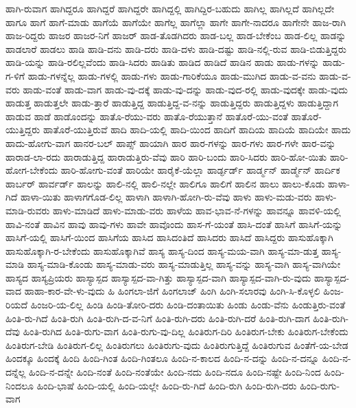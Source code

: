 {ಹಾಗಿ-ರುವಾಗ
ಹಾಗಿದ್ದರೂ
ಹಾಗಿದ್ದರೆ
ಹಾಗಿದ್ದರೇ
ಹಾಗಿದ್ದಲ್ಲಿ
ಹಾಗಿದ್ದಿರ-ಬಹುದು
ಹಾಗಿಲ್ಲ
ಹಾಗಿಲ್ಲದೆ
ಹಾಗಿಲ್ಲದೇ
ಹಾಗೂ
ಹಾಗೆ
ಹಾಗೆ-ಮಾಡು
ಹಾಗೆಯೆ
ಹಾಗೆಯೇ
ಹಾಗೆಲ್ಲ
ಹಾಗೆಲ್ಲಾ
ಹಾಗೇ
ಹಾಗೇ-ನಾದರೂ
ಹಾಗೇನೇ
ಹಾಜ-ರಾಗಿ
ಹಾಜ-ರಿದ್ದರು
ಹಾಜರ
ಹಾಜರ-ನಿಗೆ
ಹಾಜರ್
ಹಾಡ-ತೊಡಗಿದರು
ಹಾಡ-ಬಲ್ಲ
ಹಾಡ-ಬೇಕೆಂಬ
ಹಾಡ-ಲಿಲ್ಲ
ಹಾಡನ್ನು
ಹಾಡಲಾರೆ
ಹಾಡಲು
ಹಾಡಿ
ಹಾಡಿ-ದನು
ಹಾಡಿ-ದರು
ಹಾಡಿ-ದಳು
ಹಾಡಿ-ದಷ್ಟು
ಹಾಡಿ-ನಲ್ಲಿ-ರುವ
ಹಾಡಿ-ಬಿಡುತ್ತಿದ್ದರು
ಹಾಡಿ-ಯನ್ನು
ಹಾಡಿ-ರಲಿಲ್ಲವೆಂದು
ಹಾಡಿ-ಸಿದರು
ಹಾಡಿತು
ಹಾಡಿದ
ಹಾಡಿದೆ
ಹಾಡಿನ
ಹಾಡು
ಹಾಡು-ಗಳನ್ನು
ಹಾಡು-ಗ-ಳಿಗೆ
ಹಾಡು-ಗಳನ್ನೆಲ್ಲ
ಹಾಡು-ಗಳಲ್ಲಿ
ಹಾಡು-ಗಳು
ಹಾಡು-ಗಾರಿಕೆಯೂ
ಹಾಡು-ಮುಗಿದ
ಹಾಡು-ವ-ವನು
ಹಾಡು-ವ-ವರು
ಹಾಡು-ವಂತೆ
ಹಾಡು-ವಾಗ
ಹಾಡು-ವು-ದಕ್ಕೆ
ಹಾಡು-ವು-ದನ್ನು
ಹಾಡು-ವುದ-ರಲ್ಲಿ
ಹಾಡು-ವುದಕ್ಕೇ
ಹಾಡು-ವುದು
ಹಾಡುತ್ತ
ಹಾಡುತ್ತಲೇ
ಹಾಡು-ತ್ತಾರೆ
ಹಾಡುತ್ತಿದ್ದ
ಹಾಡುತ್ತಿದ್ದ-ವ-ನನ್ನು
ಹಾಡುತ್ತಿದ್ದರು
ಹಾಡುತ್ತಿದ್ದಳು
ಹಾಡುತ್ತಿದ್ದಾಗ
ಹಾಡುವ
ಹಾಡೆ
ಹಾಡೊಂದನ್ನು
ಹಾತೊ-ರೆಯು-ವರು
ಹಾತೊ-ರೆಯುತ್ತಾನೆ
ಹಾತೊರೆ-ಯು-ವಂತೆ
ಹಾತೊರೆ-ಯುತ್ತಿದ್ದರು
ಹಾತೊರೆ-ಯುತ್ತಿರುವೆ
ಹಾದಿ
ಹಾದಿ-ಯಲ್ಲಿ
ಹಾದಿ-ಯಿಂದ
ಹಾದಿಗೆ
ಹಾದಿಯ
ಹಾದಿಯೆ
ಹಾದಿಯೇ
ಹಾದು
ಹಾದು-ಹೋಗು-ವಾಗ
ಹಾನರ-ಬಲ್
ಹಾಪ್ಸ್
ಹಾಯಾಗಿ
ಹಾರ
ಹಾರ-ಗಳನ್ನು
ಹಾರ-ಗಳು
ಹಾರ-ಗಳೇ
ಹಾರ-ವನ್ನು
ಹಾರಾಡ-ಲಾ-ರದು
ಹಾರಾಡುತ್ತಿದ್ದ
ಹಾರಾಡುತ್ತಿರು-ವೆವು
ಹಾರಿ
ಹಾರಿ-ಬಂದು
ಹಾರಿ-ಸಿದರು
ಹಾರಿ-ಹೋ-ಯಿತು
ಹಾರಿ-ಹೋಗ-ಬೇಕೆಂದು
ಹಾರಿ-ಹೋಗು-ವಂತೆ
ಹಾರಿಯೇ
ಹಾರೈಕೆ-ಯೆಲ್ಲಾ
ಹಾರ್ಡ್ಫರ್ಡ್
ಹಾರ್ಡ್ಮನ್
ಹಾರ್ಡ್ಮೆನ್
ಹಾರ್ದಿಕ
ಹಾರ್ಬರ್
ಹಾರ್ವರ್ಡ್
ಹಾಲನ್ನು
ಹಾಲಿ-ನಲ್ಲಿ
ಹಾಲಿ-ನಲ್ಲೇ
ಹಾಲಿಗೂ
ಹಾಲಿಗೆ
ಹಾಲಿನ
ಹಾಲು
ಹಾಲು-ಕೊಡು
ಹಾಳಾ-ಗಿದೆ
ಹಾಳಾ-ಯಿತು
ಹಾಳಾಗಗೊಡ-ಲಿಲ್ಲ
ಹಾಳಾಗಿ
ಹಾಳಾಗಿ-ಹೋಗಿ-ರು-ವೆವು
ಹಾಳು
ಹಾಳು-ಮಡು-ವರು
ಹಾಳು-ಮಾಡಿ-ರುವರು
ಹಾಳು-ಮಾಡಿದೆ
ಹಾಳು-ಮಾಡು-ವರು
ಹಾಳೆಯ
ಹಾವ-ಭಾವ-ನೆ-ಗಳನ್ನು
ಹಾವನ್ನೂ
ಹಾವಳಿ-ಯಲ್ಲಿ
ಹಾವಿ-ನಂತೆ
ಹಾವಿನ
ಹಾವು
ಹಾವು-ಗಳು
ಹಾವೇ
ಹಾವೊಂದು
ಹಾಸ-ಗೆ-ಯಂತೆ
ಹಾಸಿ-ದಂತೆ
ಹಾಸಿಗೆ
ಹಾಸಿಗೆ-ಯನ್ನು
ಹಾಸಿಗೆ-ಯಲ್ಲಿ
ಹಾಸಿಗೆ-ಯಿಂದ
ಹಾಸಿಗೆಯ
ಹಾಸಿದ
ಹಾಸಿದಂತಿದೆ
ಹಾಸಿದರು
ಹಾಸಿದೆ
ಹಾಸಿದ್ದರು
ಹಾಸುಹೊಕ್ಕಾಗಿ
ಹಾಸುಹೊಕ್ಕಾಗಿ-ರ-ಬೇಕೆಂದು
ಹಾಸುಹೊಕ್ಕಾಗಿವೆ
ಹಾಸ್ಯ
ಹಾಸ್ಯ-ದಿಂದ
ಹಾಸ್ಯ-ಮಯ-ವಾಗಿ
ಹಾಸ್ಯ-ಮಾ-ಡುತ್ತ
ಹಾಸ್ಯ-ಮಾಡಿ
ಹಾಸ್ಯ-ಮಾಡಿ-ಕೊಂಡು
ಹಾಸ್ಯ-ಮಾಡು-ವರು
ಹಾಸ್ಯ-ಮಾಡುತ್ತಿಲ್ಲ
ಹಾಸ್ಯ-ವನ್ನು
ಹಾಸ್ಯ-ವಾಗಿ
ಹಾಸ್ಯ-ವಾಗಿಯೇ
ಹಾಸ್ಯದ
ಹಾಸ್ಯಪ್ರಿಯರು
ಹಾಸ್ಯಾಸ್ಪದ
ಹಾಸ್ಯಾಸ್ಪದ-ವಾ-ಗಿತ್ತು
ಹಾಸ್ಯಾಸ್ಪದ-ವಾಗಿ
ಹಾಸ್ಯಾಸ್ಪದ-ವಾಗಿ-ರು-ವುದು
ಹಾಸ್ಯಾಸ್ಪದ-ವಾದ
ಹಾಹಾ-ಕಾರ-ವೇ-ಳು-ವುದು
ಹಿ
ಹಿಂಗಲಾ-ಜಿಗೆ
ಹಿಂಗಲಾಜ್
ಹಿಂಗಿ
ಹಿಂಗಿ-ಸಲಾರವು
ಹಿಂಗಿ-ಸಿ-ಕೊಳ್ಳಲಿ
ಹಿಂಜ-ರಿಯದೆ
ಹಿಂಜರಿ-ಯ-ಲಿಲ್ಲ
ಹಿಂಡಿ
ಹಿಂಡಿ-ತೋರಿ-ದರು
ಹಿಂಡಿ-ದಂತಾಯಿತು
ಹಿಂಡು
ಹಿಂಡು-ವೆನು
ಹಿಂಡುತ್ತಿರು-ವಂತೆ
ಹಿಂತಿ-ರು-ಗಿದೆ
ಹಿಂತಿ-ರುಗಿ
ಹಿಂತಿ-ರುಗಿ-ದ-ವ-ನಿಗೆ
ಹಿಂತಿ-ರುಗಿ-ದರು
ಹಿಂತಿ-ರುಗಿ-ದರೆ
ಹಿಂತಿ-ರುಗಿ-ದಾಗ
ಹಿಂತಿ-ರುಗಿ-ದೆವು
ಹಿಂತಿ-ರುಗಿದ
ಹಿಂತಿ-ರುಗು-ವಾಗ
ಹಿಂತಿ-ರುಗು-ವು-ದಿಲ್ಲ
ಹಿಂತಿರುಗ-ದಿರಿ
ಹಿಂತಿರುಗ-ಬೇಕು
ಹಿಂತಿರುಗ-ಬೇಕೆಂದು
ಹಿಂತಿರುಗ-ಬೇಡಿ
ಹಿಂತಿರುಗ-ಲಿಲ್ಲ
ಹಿಂತಿರುಗಲು
ಹಿಂತಿರುಗು-ವುದು
ಹಿಂತಿರುಗುತ್ತಿದ್ದೆ
ಹಿಂತಿರುಗುವ
ಹಿಂತೆಗೆ-ಯ-ಬೇಡ
ಹಿಂದಕ್ಕೂ
ಹಿಂದಕ್ಕೆ
ಹಿಂದಿ
ಹಿಂದಿ-ಗಿಂತ
ಹಿಂದಿ-ಗಿಂತಲೂ
ಹಿಂದಿ-ನ-ಕಾಲದ
ಹಿಂದಿ-ನ-ದನ್ನು
ಹಿಂದಿ-ನ-ದನ್ನೂ
ಹಿಂದಿ-ನ-ದನ್ನೆಲ್ಲ
ಹಿಂದಿ-ನ-ದನ್ನೇ
ಹಿಂದಿ-ನಂತೆ
ಹಿಂದಿ-ನಂತೆಯೇ
ಹಿಂದಿ-ನದು
ಹಿಂದಿ-ನದೂ
ಹಿಂದಿ-ನಷ್ಟೇ
ಹಿಂದಿ-ನಿಂದ
ಹಿಂದಿ-ನಿಂದಲೂ
ಹಿಂದಿ-ಭಾಷೆ
ಹಿಂದಿ-ಯಲ್ಲಿ
ಹಿಂದಿ-ಯಲ್ಲೇ
ಹಿಂದಿ-ರು-ಗಿದೆ
ಹಿಂದಿ-ರುಗಿ
ಹಿಂದಿ-ರುಗಿ-ದರು
ಹಿಂದಿ-ರುಗು-ವಾಗ
}
